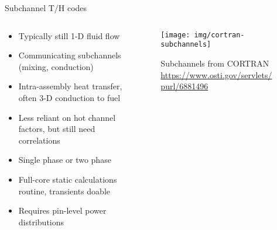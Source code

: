 \documentclass[pdf,aspectratio=169]{beamer}
\begin{document}
\begin{frame}{Subchannel T/H codes}
\begin{columns}
    \begin{column}{0.7\textwidth}
        \begin{itemize}
            \item Typically still 1-D fluid flow
            \item Communicating subchannels (mixing, conduction)
            \item Intra-assembly heat transfer, often 3-D conduction to fuel
            \item Less reliant on hot channel factors, but still need
                correlations
            \item Single phase or two phase 
            \item Full-core static calculations routine, transients doable
            \item Requires pin-level power distributions
        \end{itemize}
    \end{column}
    \begin{column}{0.3\textwidth}
        \begin{figure}[ht]
        \centering
            \texttt{[image: img/cortran-subchannels]}
            \caption{\tiny Subchannels from CORTRAN \url{https://www.osti.gov/servlets/purl/6881496}}
        \end{figure}
    \end{column}
\end{columns}
\end{frame}
\end{document}
